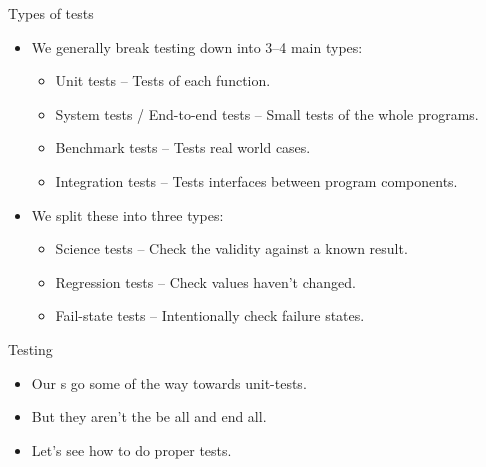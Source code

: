 \documentclass[usenames,dvipsnames]{beamer}
\newcommand{\kw}[1]{\textcolor{red}{\texttt{\detokenize{#1}}}}
\begin{document}
\begin{frame}{Types of tests}
    \begin{itemize}[<+->]
        \item{}We generally break testing down into 3--4 main types:
        \begin{itemize}
            \item{}Unit tests -- Tests of each function.
            \item{}System tests / End-to-end tests -- Small tests of the whole programs.
            \item{}Benchmark tests -- Tests real world cases.
            \item{}Integration tests -- Tests interfaces between program components.
        \end{itemize}
        \item{}We split these into three types:
        \begin{itemize}
            \item{}Science tests -- Check the validity against a known result.
            \item{}Regression tests -- Check values haven't changed.
            \item{}Fail-state tests -- Intentionally check failure states.
        \end{itemize}
    \end{itemize}
\end{frame}

\begin{frame}{Testing}
    \begin{itemize}[<+->]
        \item{}Our \kw{doctest}s go some of the way towards unit-tests.
        \item{}But they aren't the be all and end all.
        \item{}Let's see how to do proper tests.
    \end{itemize}
\end{frame}
\end{document}

